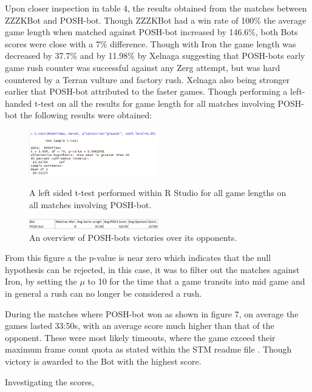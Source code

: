\documentclass[journal]{IEEEtran}
\begin{document}
	Upon closer inspection in table 4, the results obtained from the matches between ZZZKBot and POSH-bot. Though ZZZKBot had a win rate of 100\% the average game length when matched against POSH-bot increased by 146.6\%, both Bots scores were close with a 7\% difference. Though with Iron the game length was decreased by 37.7\% and by 11.98\% by Xelnaga suggesting that POSH-bots early game rush counter was successful against any Zerg attempt, but was hard countered by a Terran vulture and factory rush. Xelnaga also being stronger earlier that POSH-bot attributed to the faster games. Though performing a left-handed t-test on all the results for game length for all matches involving POSH-bot the following results were obtained:
	
	\begin{figure}[H]
		\centering
		\includegraphics[width=0.5\textwidth]{RPoshTimeLeft}
		\caption{A left sided t-test performed within R Studio for all game lengths on all matches involving POSH-bot.}
		\label{Fig5}
		\centering
		\includegraphics[width=0.5\textwidth]{PoshWinsandScore}
		\caption{An overview of POSH-bots victories over its opponents.}
		\label{poshonly}
	\end{figure}
	
	From this figure a the p-value is near zero which indicates that the null hypothesis can be rejected, in this case, it was to filter out the matches against Iron, by setting the $\mu$ to 10 for the time that a game transits into mid game and in general a rush can no longer be considered a rush. 
	
	During the matches where POSH-bot won as shown in figure 7, on average the games lasted 33:50s, with an average score much higher than that of the opponent. These were most likely timeouts, where the game exceed their maximum frame count quota as stated within the STM readme file \cite{Tournament}. Though victory is awarded to the Bot with the highest score.
	
	Investigating the scores, 
	
\end{document}
